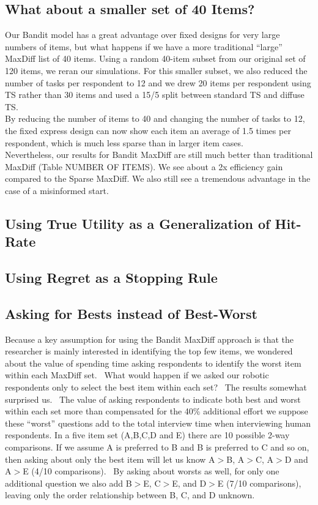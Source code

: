 \documentclass[mksc,blindrev]{informs3} %
\begin{document}
\subsection{What about a smaller set of 40 Items?}
Our Bandit model has a great advantage over fixed designs for very large numbers of items, but what happens if we have a more traditional “large” MaxDiff list of 40 items. Using a random 40-item subset from our original set of 120 items, we reran our simulations. For this smaller subset, we also reduced the number of tasks per respondent to 12 and we drew 20 items per respondent using TS rather than 30 items and used a 15/5 split between standard TS and diffuse TS.\\
By reducing the number of items to 40 and changing the number of tasks to 12, the fixed express design can now show each item an average of 1.5 times per respondent, which is much less sparse than in larger item cases.\\
Nevertheless, our results for Bandit MaxDiff are still much better than traditional MaxDiff (Table NUMBER OF ITEMS). We see about a 2x efficiency gain compared to the Sparse MaxDiff. We also still see a tremendous advantage in the case of a misinformed start.\\
\subsection{Using True Utility as a Generalization of Hit-Rate}

\subsection{Using Regret as a Stopping Rule}
\subsection{Asking for Bests instead of Best-Worst}
Because a key assumption for using the Bandit MaxDiff approach is that the researcher is mainly interested in identifying the top few items, we wondered about the value of spending time asking respondents to identify the worst item within each MaxDiff set.  What would happen if we asked our robotic respondents only to select the best item within each set?  The results somewhat surprised us.  The value of asking respondents to indicate both best and worst within each set more than compensated for the 40\% additional effort we suppose these “worst” questions add to the total interview time when interviewing human respondents.
In a five item set (A,B,C,D and E) there are 10 possible 2-way comparisons. If we assume A is preferred to B and B is preferred to C and so on, then asking about only the best item will let us know A$>$B, A$>$C, A$>$D and A$>$E (4/10 comparisons).  By asking about worsts as well, for only one additional question we also add B$>$E, C$>$E, and D$>$E (7/10 comparisons), leaving only the order relationship between B, C, and D unknown.
\end{document}
